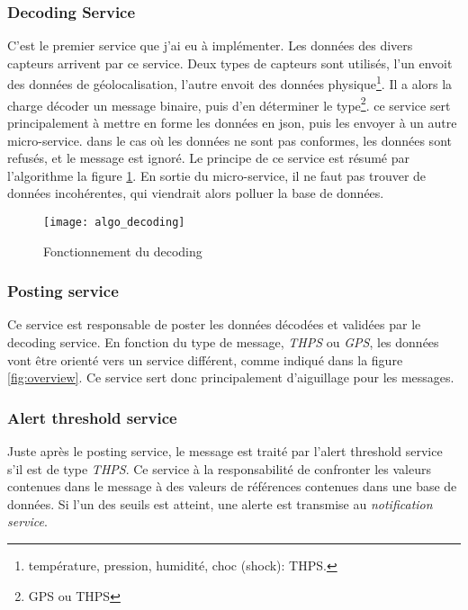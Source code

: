 \documentclass[rapport.tex]{subfiles}
\begin{document}
        \subsubsection{Decoding Service}
        C'est le premier service que j'ai eu à implémenter. 
        Les données des divers capteurs arrivent par ce service. Deux types de
        capteurs sont utilisés, l'un envoit des données de géolocalisation,
        l'autre envoit des données physique\footnote{température, pression,
        humidité, choc (shock): THPS.}. Il a alors la charge décoder un message
        binaire, puis d'en déterminer le type\footnote{GPS ou THPS}. ce service
        sert principalement à mettre en forme les données en \gls{json}, puis
        les envoyer à un autre micro-service. dans le cas où les données ne
        sont pas conformes, les données sont refusés, et le message est ignoré.
        Le principe de ce service est résumé par l'algorithme la figure
        \ref{fig:algo_decoding}.
        En sortie du micro-service, il ne faut pas trouver de données
        incohérentes, qui viendrait alors 
        polluer la base de données.

        \begin{figure}
            \centering
            \texttt{[image: algo\_decoding]}
            \caption{Fonctionnement du decoding}\label{fig:algo_decoding}
        \end{figure}

        \subsubsection{Posting service}
        Ce service est responsable de poster les données décodées et validées par le decoding service.
        En fonction du type de message, \textit{THPS} ou \textit{GPS}, les données vont être orienté vers un service différent,
        comme indiqué dans la figure \ref{fig:overview}. Ce service sert donc principalement d'aiguillage pour les messages.

        \subsubsection{Alert threshold service}
        Juste après le posting service, le message est traité par l'alert threshold service s'il est de type \textit{THPS}.
        Ce service à la responsabilité de confronter les valeurs contenues dans le message à des valeurs de références contenues dans
        une base de données. Si l'un des seuils est atteint, une alerte est transmise au \emph{notification service}.
\end{document}
